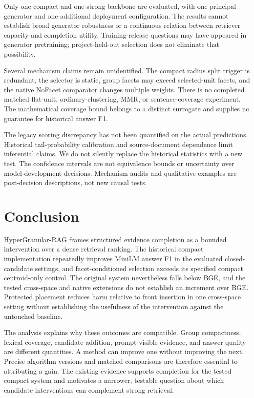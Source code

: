 \documentclass[11pt,a4paper]{article}
\newcommand{\hgrag}{HyperGranular-RAG\xspace}
\begin{document}
Only one compact and one strong backbone are evaluated, with one principal
generator and one additional deployment configuration. The results cannot
establish broad generator robustness or a continuous relation between
retriever capacity and completion utility. Training-release questions may
have appeared in generator pretraining; project-held-out selection does not
eliminate that possibility.

Several mechanism claims remain unidentified. The compact radius split
trigger is redundant, the selector is static, group facets may exceed
selected-unit facets, and the native NoFacet comparator changes multiple
weights. There is no completed matched flat-unit, ordinary-clustering,
MMR, or sentence-coverage experiment. The mathematical coverage bound
belongs to a distinct surrogate and supplies no guarantee for historical
answer F1.

The legacy scoring discrepancy has not been quantified on the actual
predictions. Historical tail-probability calibration and source-document
dependence limit inferential claims. We do not silently replace the
historical statistics with a new test. The confidence intervals are not
equivalence bounds or uncertainty over model-development decisions.
Mechanism audits and qualitative examples are post-decision descriptions,
not new causal tests.

\section{Conclusion}
\hgrag frames structured evidence completion as a bounded intervention over
a dense retrieval ranking. The historical compact implementation repeatedly
improves MiniLM answer F1 in the evaluated closed-candidate settings, and
facet-conditioned selection exceeds its specified compact centroid-only
control. The original system nevertheless falls below BGE, and the tested
cross-space and native extensions do not establish an increment over BGE.
Protected placement reduces harm relative to front insertion in one
cross-space setting without establishing the usefulness of the intervention
against the untouched baseline.

The analysis explains why these outcomes are compatible. Group compactness,
lexical coverage, candidate addition, prompt-visible evidence, and answer
quality are different quantities. A method can improve one without
improving the next. Precise algorithm versions and matched comparisons are
therefore essential to attributing a gain. The existing evidence supports
completion for the tested compact system and motivates a narrower,
testable question about which candidate interventions can complement strong
retrieval.
\end{document}
